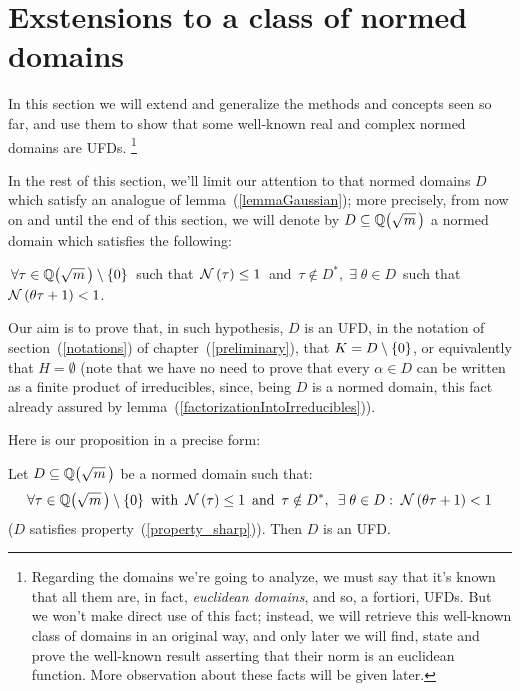 \section{Exstensions to a class of normed domains}\label{ext}

In this section we will extend and generalize the methods and
concepts seen so far, and use them to show that some well-known
real and complex normed domains are UFDs.%
\footnote{Regarding the domains we're going to analyze, we must
say that it's known that all them are, in fact,\/
\emph{euclidean domains\/}, and so, a fortiori, UFDs.
But we won't make direct use of this fact; instead, we will retrieve
this well-known class of domains in an original way, and only later
we will find, state and prove the well-known result asserting that
their norm is an euclidean function. More observation about these
facts will be given later.}

\medskip
In the rest of this section, we'll limit our attention to that normed
domains $D$ which satisfy an analogue of lemma~(\ref{lemmaGaussian});
more precisely, from now on and until the end of this section, we will
denote by $D \subseteq \QQ{m}$ a normed domain which satisfies the
following:

\begin{property}\label{property_sharp} 
$\,\forall \tau \in \QQ{m}\minz$\,
such that\, $\mathcal{N}\left(\tau\right) \leq 1$\,
and\, $\tau \notin D^\ast,\; \exists\; \theta \in D$
\,such that\, $\mathcal{N}\left(\theta\tau + 1\right) < 1$.
\end{property}

Our aim is to prove that, in such hypothesis, $D$
is an UFD, \ie in the notation of section~(\ref{notations})
of chapter~(\ref{preliminary}), that $K = D\setminus\left\{0\right\}$,
or equivalently that $H = \emptyset$ (note that we have no
need to prove that every $\alpha \in D$ can be written as a
finite product of irreducibles, since, being $D$ is a normed
domain, this fact already assured by
lemma~(\ref{factorizationIntoIrreducibles})).

Here is our proposition in a precise form:

\begin{thm}\label{property_sharp_implies_UFD}
Let $D \subseteq \QQ{m}$ be a normed domain such that:
$$
\forall \tau \in \QQ{m}\minz \text{ with }\, \Norm{\tau} \leq 1
\textrm{ \,and\, }
\tau \notin D^\ast,\ \, \exists\; \theta \in D:\;
 \Norm{\theta\tau + 1} < 1
$$
(\ie $D$ satisfies property~(\ref{property_sharp})).
Then $D$ is an UFD.
\end{thm}

